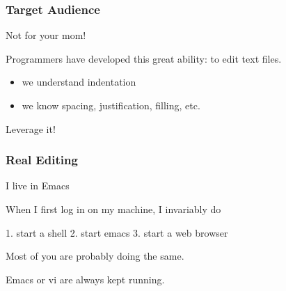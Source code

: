 \documentclass[compress,trans]{beamer}
\begin{document}
\begin{frame}[fragile]
  \frametitle{Target Audience}
 
 Not for your mom!
 
\pause
 Programmers have developed this great ability: to edit text files.
 
 \begin{itemize}
 \item we understand indentation
 \item we know spacing, justification, filling, etc.
 \end{itemize}
 
 Leverage it!
 
\end{frame}

 
\begin{frame}[fragile]
  \frametitle{Real Editing}

I live in Emacs

When I first log in on my machine, I invariably do

1. start a shell
2. start emacs
3. start a web browser

Most of you are probably doing the same.

Emacs or vi are always kept running.
 
\end{frame}
 



% 
% 
% 
% 
% 
% 
% 
% 
% 
% 
% 
% 
% 
% 
% 
% 
% 
% 
\end{document}
